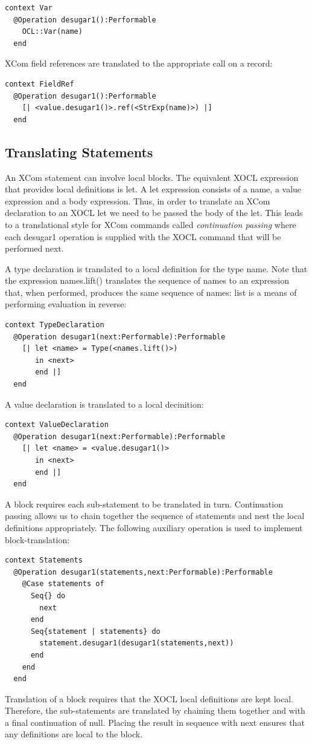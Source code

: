 \begin{lstlisting}
context Var
  @Operation desugar1():Performable
    OCL::Var(name)
  end
\end{lstlisting}XCom field references are translated to the appropriate call on a
record:

\begin{lstlisting}
context FieldRef
  @Operation desugar1():Performable
    [| <value.desugar1()>.ref(<StrExp(name)>) |]
  end
\end{lstlisting}
\subsection{Translating Statements}

An XCom statement can involve local blocks. The equivalent XOCL expression
that provides local definitions is let. A let expression consists
of a name, a value expression and a body expression. Thus, in order
to translate an XCom declaration to an XOCL let we need to be passed
the body of the let. This leads to a translational style for XCom
commands called \emph{continuation passing} where each desugar1 operation
is supplied with the XOCL command that will be performed next.

A type declaration is translated to a local definition for the type
name. Note that the expression names.lift() translates the sequence
of names to an expression that, when performed, produces the same
sequence of names: list is a means of performing evaluation in reverse:

\begin{lstlisting}
context TypeDeclaration
  @Operation desugar1(next:Performable):Performable
    [| let <name> = Type(<names.lift()>) 
       in <next> 
       end |]
  end
\end{lstlisting}A value declaration is translated to a local decinition:

\begin{lstlisting}
context ValueDeclaration
  @Operation desugar1(next:Performable):Performable
    [| let <name> = <value.desugar1()> 
       in <next> 
       end |]
  end
\end{lstlisting}A block requires each sub-statement to be translated in turn. Continuation
passing allows us to chain together the sequence of statements and
nest the local definitions appropriately. The following auxiliary
operation is used to implement block-translation:

\begin{lstlisting}
context Statements
  @Operation desugar1(statements,next:Performable):Performable
    @Case statements of
      Seq{} do 
        next 
      end
      Seq{statement | statements} do 
        statement.desugar1(desugar1(statements,next)) 
      end
    end
  end
\end{lstlisting}Translation of a block requires that the XOCL local definitions are
kept local. Therefore, the sub-statements are translated by chaining
them together and with a final continuation of null. Placing the result
in sequence with next ensures that any definitions
are local to the block.

